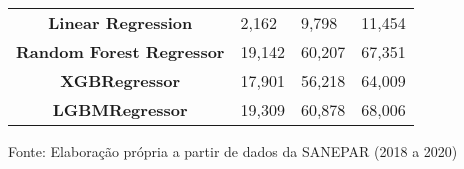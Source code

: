 \begin{table}[H]
\begin{tabular}{@{}clll@{}}
\textbf{Linear Regression}        & 2,162                             & 9,798                            & 11,454                            \\
\textbf{Random Forest Regressor}  & 19,142                            & 60,207                           & 67,351                            \\
\textbf{XGBRegressor}             & 17,901                            & 56,218                           & 64,009                            \\
\textbf{LGBMRegressor}            & 19,309                            & 60,878                           & 68,006                            \\ \bottomrule
	\end{tabular}

Fonte: Elaboração própria a partir de dados da SANEPAR (2018 a 2020)
\end{table}

